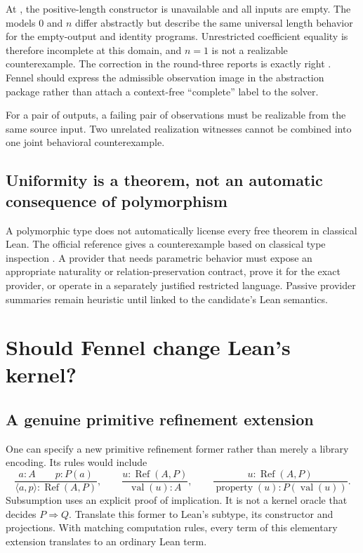 \documentclass[11pt,a4paper]{article}
\theoremstyle{definition}
\theoremstyle{remark}
\newcommand{\code}[1]{\texttt{\detokenize{#1}}}
\begin{document}
At \code{List Empty}, the positive-length constructor is unavailable and all
inputs are empty. The models $0$ and $n$ differ abstractly but describe the
same universal length behavior for the empty-output and identity programs.
Unrestricted coefficient equality is therefore incomplete at this domain, and
$n=1$ is not a realizable counterexample. The correction in the round-three
reports is exactly right \cite{synA,synB}. Fennel should express the admissible
observation image in the abstraction package rather than attach a context-free
``complete'' label to the solver.

For a pair of outputs, a failing pair of observations must be realizable from
the same source input. Two unrelated realization witnesses cannot be combined
into one joint behavioral counterexample.

\subsection{Uniformity is a theorem, not an automatic consequence of polymorphism}
A polymorphic type does not automatically license every free theorem in
classical Lean. The official reference gives a counterexample based on
classical type inspection \cite{leanAxioms}. A provider that needs parametric
behavior must expose an appropriate naturality or relation-preservation
contract, prove it for the exact provider, or operate in a separately justified
restricted language. Passive provider summaries remain heuristic until linked
to the candidate's Lean semantics.

\section{Should Fennel change Lean's kernel?}
\label{sec:kernel}

\subsection{A genuine primitive refinement extension}
One can specify a new primitive refinement former rather than merely a library
encoding. Its rules would include
\[
 \frac{a:A\qquad p:P(a)}{\langle a,p\rangle:\operatorname{Ref}(A,P)},\qquad
 \frac{u:\operatorname{Ref}(A,P)}{\operatorname{val}(u):A},\qquad
 \frac{u:\operatorname{Ref}(A,P)}{\operatorname{property}(u):P(\operatorname{val}(u))}.
\]
Subsumption uses an explicit proof of implication. It is not a kernel oracle
that decides $P\Rightarrow Q$. Translate this former to Lean's subtype, its
constructor and projections. With matching computation rules, every term of
this elementary extension translates to an ordinary Lean term.
\end{document}
